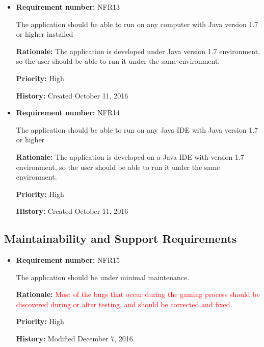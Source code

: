 \documentclass[12pt,letterpaper]{article}
\begin{document}
\begin{reqbox}
	\begin{itemize}
	\item \textbf{Requirement number: }NFR13

	The application should be able to run on any computer with Java version 1.7 or higher installed

	\textbf{Rationale: }The application is developed under Java version 1.7 environment, so the user should be able to run it under the same environment. 

	\textbf{Priority: }High

	\textbf{History: }Created October 11, 2016

	\end{itemize}
\end{reqbox}

\begin{reqbox}
	\begin{itemize}
\subsubsection{Partner Application}

	\item \textbf{Requirement number: }NFR14

	The application should be able to run on any Java IDE with Java version 1.7 or higher

	\textbf{Rationale: }The application is developed on a Java IDE with version 1.7 environment, so the user should be able to run it under the same environment. 

	\textbf{Priority: }High

	\textbf{History: }Created October 11, 2016
	\end{itemize}
\end{reqbox}


\subsection{Maintainability and Support Requirements}

\begin{reqbox}
	\begin{itemize}
\subsubsection{Maintenance Requirement}

	\item \textbf{Requirement number: }NFR15

	The application should be under minimal maintenance.

	\textbf{Rationale: }\textcolor{red}{Most of the bugs that occur during the gaming process should be discovered during or after testing, and should be corrected and fixed.}

	\textbf{Priority: }High

	\textbf{History: }Modified December 7, 2016

	\end{itemize}
\end{reqbox}
\end{document}
